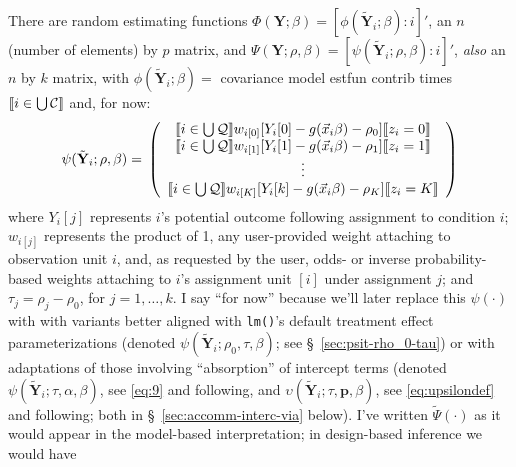 \documentclass{article}
\DeclarePairedDelimiter{\indicator}{\llbracket}{\rrbracket}
\newcommand{\owt}[1][z_i]{\ensuremath{w_{i[#1]}}}
\begin{document}
There are random estimating functions $\Phi(\mathbf{Y}; \beta ) =
[\phi(\tilde{\mathbf{Y}}_{i};
\beta) : i]'$, an $n$ (number of elements) by $p$ matrix,  and 
       $\Psi(\mathbf{Y}; \rho, \beta) = [\psi(\tilde{\mathbf{Y}}_{i};
       \rho, \beta): i]'$, \textit{also} an $n$ by $k$ matrix, with 
       $\phi(\tilde{\mathbf{Y}}_{i}; \beta)=$ covariance model estfun
       contrib times $\indicator{i \in \bigcup \mathcal{C}}$ and, for now:
\begin{equation}
         \label{eq:5}
         \psi(\tilde{\mathbf{Y}}_{i}; \rho, \beta) =\\
         \left( \begin{array}{c}
           \indicator{i \in \bigcup \mathcal{Q}}\owt[0] [Y_{i}[0] - g(\vec{x}_{i}\beta)-
                  \rho_{0}]\indicator{z_{i}=0}\\
           \indicator{i \in \bigcup \mathcal{Q}}\owt[1] [Y_{i}[1] - g(\vec{x}_{i}\beta)-
                  \rho_{1}]\indicator{z_{i}=1}\\
                  \vdots \\
           \indicator{i \in \bigcup \mathcal{Q}}\owt[K] [Y_{i}[k] - g(\vec{x}_{i}\beta)-
                  \rho_{K}]\indicator{z_{i}=K}\\                  
                \end{array}\right)
\end{equation}
where $Y_{i}[j]$ represents $i$'s potential outcome following
assignment to condition $i$; $\owt[j]$ represents the product of 1, any user-provided weight attaching to observation unit $i$, and, as requested by the user, odds- or inverse probability-based weights attaching to $i$'s assignment unit $[i]$ under assignment $j$; and $\tau_{j} = \rho_{j}-\rho_{0}$, for $j=1,
\ldots, k$. I say ``for now'' because we'll later replace this $\psi(\cdot)$ with
with variants better aligned with \texttt{lm()}'s default treatment effect parameterizations (denoted $\psi(\tilde{\mathbf{Y}}_{i}; \rho_{0}, \tau, \beta)$; see \S~\ref{sec:psit-rho_0-tau})  or with adaptations of those involving ``absorption'' of intercept terms (denoted $\psi(\tilde{\mathbf{Y}}_{i}; \tau, \alpha, \beta)$, see \eqref{eq:9} and following, and $\upsilon(\tilde{\mathbf{Y}}_{i}; \tau, \mathbf{p}, \beta)$, see \eqref{eq:upsilondef} and following; both in \S~\ref{sec:accomm-interc-via} below).  I've written $\tilde{\Psi}(\cdot)$ as
it would appear in the model-based interpretation; in design-based
inference we would have
\end{document}
